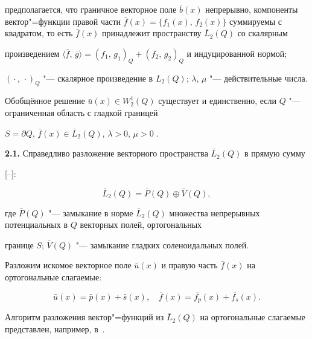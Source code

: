 предполагается, что граничное векторное поле $\bar{b}(x)$ непрерывно, компоненты вектор"=функции правой части $\bar{f}(x) = \{

f_{1}(x),\,f_{2}(x)\}$ суммируемы с квадратом, то есть $\bar{f}(x)$ принадлежит пространству $\bar{L}_{2}(Q)$ со скалярным

произведением $\langle \bar{f},\, \bar{g} \rangle = (f_1,\,g_1)_Q + (f_2,\,g_2)_Q$ и индуцированной нормой; 

$({}\cdot{},\,{}\cdot{})_Q$ "--- скалярное произведение в $L_{2}(Q)$; $\lambda$, $\mu$ "--- действительные числа.



Обобщённое решение $\bar{u}(x) \in W^{1}_{2}(Q)$ существует и единственно, если $Q$ "--- ограниченная область с гладкой границей

$S = \partial Q$, $\bar{f}(x) \in \bar{L}_{2}(Q)$, $\lambda > 0$, $\mu > 0$ \cite{lezh:LzhMrk:bib:Oley}.





\smallskip






\textbf{2.1.} Справедливо разложение векторного пространства $\bar{L}_{2}(Q)$ в прямую сумму

[--]:

\[

   \bar{L}_2(Q) =  \bar{P}(Q) \oplus \bar{V}(Q),

\]

где $\bar{P}(Q)$ "--- замыкание в норме $\bar{L}_{2}(Q)$ множества непрерывных потенциальных в $Q$ векторных полей, ортогональных

границе $S$; $\bar{V}(Q)$ "--- замыкание гладких соленоидальных полей.



Разложим искомое векторное поле $\bar{u}(x)$ и правую часть $\bar{f}(x)$ на ортогональные слагаемые:

\[

   \bar{u}(x) = \bar{p}(x) + \bar{s}(x), \quad \bar{f}(x) = \bar{f_{p}}(x) + \bar{f_{s}}(x).

\]

Алгоритм разложения вектор"=функций из $\bar{L}_{2}(Q)$ на ортогональные слагаемые представлен, например, в~\cite{lezh:LzhMrk:bib:LD}.



